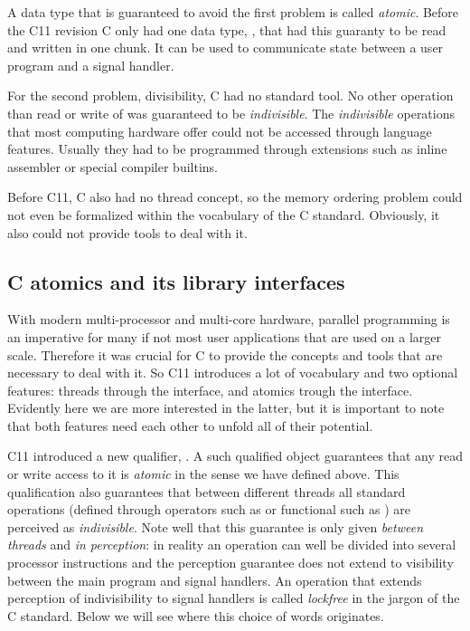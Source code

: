 \itemadjust
A data type that is guaranteed to avoid the first problem is called
\emph{atomic}. Before the C11 revision C only had one data type,
, that had this guaranty to be read and written in one
chunk. It can be used to communicate state between a user program
and a signal handler.

For the second problem, divisibility, C had no standard tool. No
other operation than read or write of  was guaranteed
to be \emph{indivisible}.  The \emph{indivisible} operations that most
computing hardware offer could not be accessed through language
features. Usually they had to be programmed through extensions such
as inline assembler or special compiler builtins.

Before C11, C also had no thread concept, so the memory ordering
problem could not even be formalized within the vocabulary of the C
standard. Obviously, it also could not provide tools to deal with
it.

\subsection{C atomics and its library interfaces}
\label{sec-2-1}

With modern multi-processor and multi-core hardware, parallel
programming is an imperative for many if not most user applications
that are used on a larger scale. Therefore it was crucial for C to
provide the concepts and tools that are necessary to deal with
it. So C11 introduces a lot of vocabulary and two optional
features: threads through the  interface, and atomics
trough the  interface. Evidently here we are more
interested in the latter, but it is important to note that both
features need each other to unfold all of their potential.

C11 introduced a new qualifier, . A such qualified object
guarantees that any read or write access to it is \emph{atomic} in the
sense we have defined above. This qualification also guarantees
that between different threads all standard operations (defined
through operators such as \code{+=} or functional such as
) are perceived as \emph{indivisible}. Note well that
this guarantee is only given \emph{between threads} and \emph{in perception}:
in reality an operation can well be divided into several processor
instructions and the perception guarantee does not extend to
visibility between the main program and signal handlers. An
operation that extends perception of indivisibility to signal
handlers is called \emph{lockfree} in the jargon of the C
standard. Below we will see where this choice of words originates.

